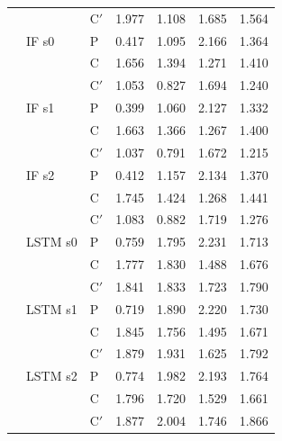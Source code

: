 \begin{footnotesize}
\begin{longtable}{lllrrrr}
 &  & C$'$ & 1.977 & 1.108 & 1.685 & 1.564 \\
 & IF s0 & P & 0.417 & 1.095 & 2.166 & 1.364 \\
 &  & C & 1.656 & 1.394 & 1.271 & 1.410 \\
 &  & C$'$ & 1.053 & 0.827 & 1.694 & 1.240 \\
 & IF s1 & P & 0.399 & 1.060 & 2.127 & 1.332 \\
 &  & C & 1.663 & 1.366 & 1.267 & 1.400 \\
 &  & C$'$ & 1.037 & 0.791 & 1.672 & 1.215 \\
 & IF s2 & P & 0.412 & 1.157 & 2.134 & 1.370 \\
 &  & C & 1.745 & 1.424 & 1.268 & 1.441 \\
 &  & C$'$ & 1.083 & 0.882 & 1.719 & 1.276 \\
 & LSTM s0 & P & 0.759 & 1.795 & 2.231 & 1.713 \\
 &  & C & 1.777 & 1.830 & 1.488 & 1.676 \\
 &  & C$'$ & 1.841 & 1.833 & 1.723 & 1.790 \\
 & LSTM s1 & P & 0.719 & 1.890 & 2.220 & 1.730 \\
 &  & C & 1.845 & 1.756 & 1.495 & 1.671 \\
 &  & C$'$ & 1.879 & 1.931 & 1.625 & 1.792 \\
 & LSTM s2 & P & 0.774 & 1.982 & 2.193 & 1.764 \\
 &  & C & 1.796 & 1.720 & 1.529 & 1.661 \\
 &  & C$'$ & 1.877 & 2.004 & 1.746 & 1.866 \\
\end{longtable}
\end{footnotesize}
